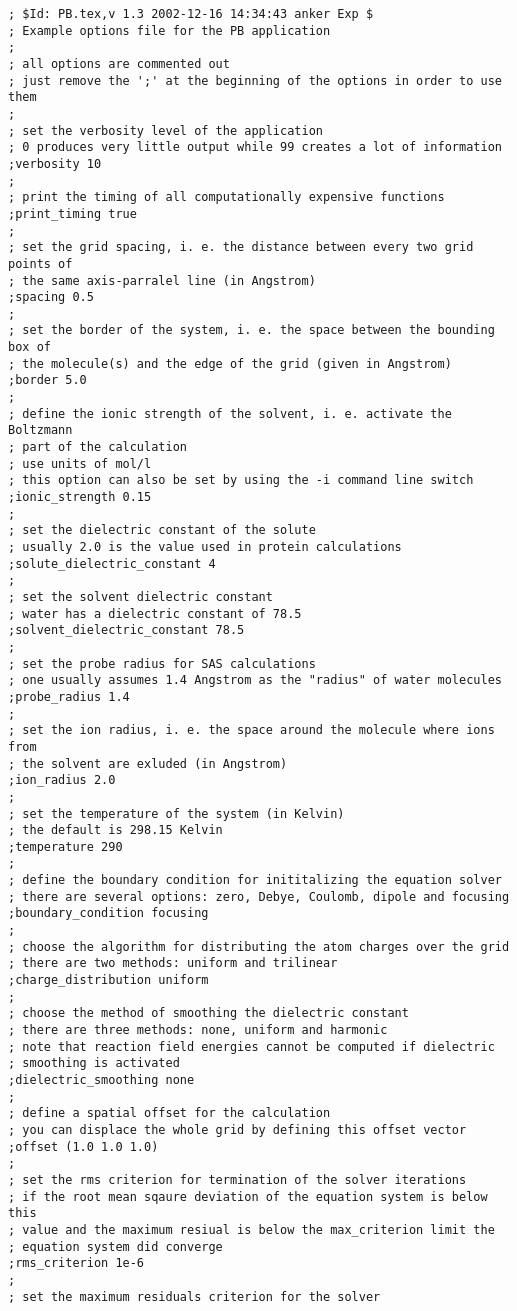 \documentclass[12pt,twoside,a4paper]{article}
\begin{document}
\scriptsize
\begin{verbatim}
; $Id: PB.tex,v 1.3 2002-12-16 14:34:43 anker Exp $
; Example options file for the PB application
;
; all options are commented out
; just remove the ';' at the beginning of the options in order to use them
;
; set the verbosity level of the application 
; 0 produces very little output while 99 creates a lot of information
;verbosity 10 
;
; print the timing of all computationally expensive functions
;print_timing true
;
; set the grid spacing, i. e. the distance between every two grid points of
; the same axis-parralel line (in Angstrom)
;spacing 0.5
;
; set the border of the system, i. e. the space between the bounding box of
; the molecule(s) and the edge of the grid (given in Angstrom)
;border 5.0
;
; define the ionic strength of the solvent, i. e. activate the Boltzmann
; part of the calculation
; use units of mol/l
; this option can also be set by using the -i command line switch
;ionic_strength 0.15
;
; set the dielectric constant of the solute
; usually 2.0 is the value used in protein calculations
;solute_dielectric_constant 4
;
; set the solvent dielectric constant
; water has a dielectric constant of 78.5
;solvent_dielectric_constant 78.5
;
; set the probe radius for SAS calculations
; one usually assumes 1.4 Angstrom as the "radius" of water molecules
;probe_radius 1.4
;
; set the ion radius, i. e. the space around the molecule where ions from
; the solvent are exluded (in Angstrom)
;ion_radius 2.0
;
; set the temperature of the system (in Kelvin)
; the default is 298.15 Kelvin
;temperature 290
;
; define the boundary condition for inititalizing the equation solver
; there are several options: zero, Debye, Coulomb, dipole and focusing
;boundary_condition focusing
;
; choose the algorithm for distributing the atom charges over the grid
; there are two methods: uniform and trilinear
;charge_distribution uniform
;
; choose the method of smoothing the dielectric constant
; there are three methods: none, uniform and harmonic
; note that reaction field energies cannot be computed if dielectric
; smoothing is activated
;dielectric_smoothing none
;
; define a spatial offset for the calculation
; you can displace the whole grid by defining this offset vector
;offset (1.0 1.0 1.0)
;
; set the rms criterion for termination of the solver iterations
; if the root mean sqaure deviation of the equation system is below this
; value and the maximum resiual is below the max_criterion limit the
; equation system did converge
;rms_criterion 1e-6
;
; set the maximum residuals criterion for the solver

\end{verbatim}
\end{document}
